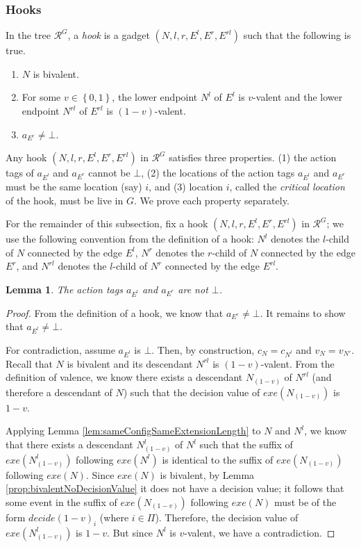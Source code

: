 \documentclass[11pt]{article}
\numberwithin{theorem}{section}
\newtheorem{lemma}[theorem]{Lemma}
\newcommand{\set}[1]{\left\{#1\right\}}
\begin{document}
\subsubsection{Hooks}
\label{subsubsec:HookProperties}

In the tree $\mathcal{R}^{G}$, a \emph{hook} is a gadget $(N,l,r,E^l,E^r,E^{rl})$ such that the following is true.
\begin{enumerate}
 \item $N$ is bivalent.
 \item For some $v \in \set{0,1}$, the lower endpoint $N^l$ of $E^l$ is $v$-valent and the lower endpoint $N^{rl}$ of $E^{rl}$ is $(1-v)$-valent.  
\item $a_{E^r} \neq \bot$.
\end{enumerate}


Any hook $(N,l,r,E^l,E^r,E^{rl})$ in $\mathcal{R}^G$ satisfies three properties. (1) the action tags of $a_{E^l}$ and $a_{E^r}$ cannot be $\bot$, (2) the locations of the action tags $a_{E^l}$ and $a_{E^r}$ must be the same location (say) $i$, and (3) location $i$, called the \emph{critical location} of the hook, must be live in $G$. We prove each property separately.

For the remainder of this subsection, fix a hook $(N,l,r,E^l,E^r,E^{rl})$ in $\mathcal{R}^G$; we use the following convention from the definition of a hook: $N^l$ denotes the $l$-child of $N$ connected by the edge $E^l$, $N^r$ denotes the $r$-child of $N$ connected by the edge $E^r$, and $N^{rl}$ denotes the $l$-child of $N^r$ connected by the edge $E^{rl}$.


\begin{lemma}\label{thm:hookEventTagsNotBot}
The action tags $a_{E^l}$ and $a_{E^r}$ are not $\bot$.
\end{lemma}
\begin{proof} 
From the definition of a hook, we know that $a_{E^r} \neq \bot$. It remains to show that $a_{E^l} \neq \bot$.

For contradiction, assume $a_{E^l}$ is $\bot$.
Then, by construction, $c_N=c_{N^l}$ and $v_N = v_{N'}$. Recall that $N$ is bivalent and its descendant $N^{rl}$ is $(1-v)$-valent. From the definition of valence, we know there exists a descendant $N_{(1-v)}$ of $N^{rl}$ (and therefore a descendant of $N$) such that the decision value of $exe(N_{(1-v)})$ is $1-v$.

 Applying Lemma \ref{lem:sameConfigSameExtensionLength} to $N$ and $N^l$, we know that there exists a descendant $N^{l}_{(1-v)}$ of $N^l$ such that the suffix of $exe(N^{l}_{(1-v)})$ following $exe(N^l)$ is identical to the suffix of $exe(N_{(1-v)})$ following $exe(N)$. Since  $exe(N)$ is bivalent, by Lemma \ref{prop:bivalentNoDecisionValue} it does not have a decision value; it follows that some event in the suffix of $exe(N_{(1-v)})$ following $exe(N)$ must be of the form $decide(1-v)_i$ (where $i \in \Pi$). Therefore, the decision value of $exe(N^{l}_{(1-v)})$ is $1-v$. But since $N^l$ is $v$-valent, we have a contradiction. 
\end{proof}
\end{document}
